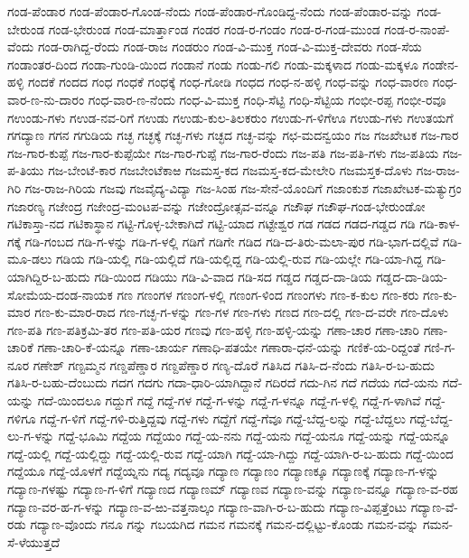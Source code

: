 ಗಂಡ-ಪೆಂಡಾರ
ಗಂಡ-ಪೆಂಡಾರ-ಗೊಂಡ-ನೆಂದು
ಗಂಡ-ಪೆಂಡಾರ-ಗೊಂಡಿದ್ದ-ನೆಂದು
ಗಂಡ-ಪೆಂಡಾರ-ವನ್ನು
ಗಂಡ-ಬೇರುಂಡ
ಗಂಡ-ಭೇರುಂಡ
ಗಂಡ-ಮಾರ್ತ್ತಾಂಡ
ಗಂಡರ
ಗಂಡ-ರ-ಗಂಡಂ
ಗಂಡ-ರ-ಗಂಡ-ಮುಂಡ
ಗಂಡ-ರ-ನಾಂಪೆ-ವೆಂದು
ಗಂಡ-ರಾಗಿದ್ದ-ರೆಂದು
ಗಂಡ-ರಾಜ
ಗಂಡರುಂ
ಗಂಡ-ವಿ-ಮುಕ್ತ
ಗಂಡ-ವಿ-ಮುಕ್ತ-ದೇವರು
ಗಂಡ-ಸೆಯ
ಗಂಡಾಂತರ-ದಿಂದ
ಗಂಡಾ-ಗುಂಡಿ-ಯಿಂದ
ಗಂಡಾನೆ
ಗಂಡು
ಗಂಡು-ಗಲಿ
ಗಂಡು-ಮಕ್ಕಳಾದ
ಗಂಡು-ಮಕ್ಕಳೂ
ಗಂಡೇನ-ಹಳ್ಳಿ
ಗಂದಕೆ
ಗಂದದ
ಗಂಧ
ಗಂಧಕೆ
ಗಂಧಕ್ಕೆ
ಗಂಧ-ಗೋಡಿ
ಗಂಧದ
ಗಂಧ-ನ-ಹಳ್ಳಿ
ಗಂಧ-ವನ್ನು
ಗಂಧ-ವಾರಣ
ಗಂಧ-ವಾರ-ಣ-ನು-ದಾರಂ
ಗಂಧ-ವಾರ-ಣ-ನೆಂದು
ಗಂಧ-ವಿ-ಮುಕ್ತ
ಗಂಧಿ-ಸೆಟ್ಟಿ
ಗಂಧಿ-ಸೆಟ್ಟಿಯ
ಗಂಭೀ-ರಪ್ಪ
ಗಂಭೀ-ರವೂ
ಗಉಂಡು-ಗಳು
ಗಉಡ-ನವ-ರಿಗೆ
ಗಉಡು
ಗಉಡು-ಕುಲ-ತಿಲಕರುಂ
ಗಉಡು-ಗ-ಳಿಗೆಊ
ಗಉಡು-ಗಳು
ಗಉತಯಗೆ
ಗಗದ್ಯಾಣ
ಗಗನ
ಗಗುಡಿಯ
ಗಚ್ಛ
ಗಚ್ಛಕ್ಕೆ
ಗಚ್ಛ-ಗಳು
ಗಚ್ಛದ
ಗಚ್ಛ-ವನ್ನು
ಗಛ-ಮದನ್ವಯಂ
ಗಜ
ಗಜಖೇಟಕ
ಗಜ-ಗಾರ
ಗಜ-ಗಾರ-ಕುಪ್ಪೆ
ಗಜ-ಗಾರ-ಕುಪ್ಪೆಯೇ
ಗಜ-ಗಾರ-ಗುಪ್ಪೆ
ಗಜ-ಗಾರ-ರೆಂದು
ಗಜ-ಪತಿ
ಗಜ-ಪತಿ-ಗಳು
ಗಜ-ಪತಿಯ
ಗಜ-ಪ-ತಿಯು
ಗಜ-ಬೇಂಟೆ-ಕಾರ
ಗಜಬೇಂಟೆಕಾಱ
ಗಜಮಸ್ತ-ಕದ
ಗಜಮಸ್ತ-ಕದ-ಮೇಲೇರಿ
ಗಜಮಸ್ತಕ-ದೊಳು
ಗಜ-ರಾಜ-ಗಿರಿ
ಗಜ-ರಾಜ-ಗಿರಿಯ
ಗಜವು
ಗಜವೈದ್ಯ-ವಿದ್ಯಾ
ಗಜ-ಸಿಂಹ
ಗಜ-ಸೇನೆ-ಯೊಂದಿಗೆ
ಗಜಾಂಕುಶ
ಗಜಾಖೇಟಕ-ಮತ್ಯುಗ್ರಂ
ಗಜಾರಣ್ಯ
ಗಜೇಂದ್ರ
ಗಜೇಂದ್ರ-ಮಂಟಪ-ವನ್ನು
ಗಜೇಂದ್ರೋತ್ಸವ-ವನ್ನೂ
ಗಜೌಘ
ಗಜೌಘ-ಗಂಡ-ಭೇರುಂಡೋ
ಗಟಿಕಾಸ್ತಾ-ನದ
ಗಟಿಕಾಸ್ಥಾನ
ಗಟ್ಟಿ-ಗೊಳ್ಳ-ಬೇಕಾಗಿದೆ
ಗಟ್ಟಿ-ಯಾದ
ಗಟ್ಟೇಶ್ವರ
ಗಡ
ಗಡದ
ಗಡದ-ಗಡ್ಡದ
ಗಡಿ
ಗಡಿ-ಕಾಳ-ಗಕ್ಕೆ
ಗಡಿ-ಗಂಬದ
ಗಡಿ-ಗ-ಳನ್ನು
ಗಡಿ-ಗ-ಳಲ್ಲಿ
ಗಡಿಗೆ
ಗಡಿಗೇ
ಗಡಿದ
ಗಡಿ-ದ-ತಿರು-ಮಲಾ-ಪುರ
ಗಡಿ-ಭಾಗ-ದಲ್ಲಿವೆ
ಗಡಿ-ಮೂ-ಡಲು
ಗಡಿಯ
ಗಡಿ-ಯಲ್ಲಿ
ಗಡಿ-ಯಲ್ಲಿದೆ
ಗಡಿ-ಯಲ್ಲಿದ್ದ
ಗಡಿ-ಯಲ್ಲಿ-ರುವ
ಗಡಿ-ಯಲ್ಲೇ
ಗಡಿ-ಯಾ-ಗಿದ್ದ
ಗಡಿ-ಯಾಗಿದ್ದಿರ-ಬ-ಹುದು
ಗಡಿ-ಯಿಂದ
ಗಡಿಯು
ಗಡಿ-ವಿ-ವಾದ
ಗಡಿ-ಸದ
ಗಡ್ಡದ
ಗಡ್ಡದ-ದಾ-ಡಿಯ
ಗಡ್ಡದ-ದಾ-ಡಿಯ-ಸೋಮೆಯ-ದಂಡ-ನಾಯಕ
ಗಣ
ಗಣಂಗಳ
ಗಣಂಗ-ಳಲ್ಲಿ
ಗಣಂಗ-ಳಿಂದ
ಗಣಂಗಳು
ಗಣ-ಕ-ಕುಲ
ಗಣ-ಕರು
ಗಣ-ಕು-ಮಾರ
ಗಣ-ಕು-ಮಾರ-ರಾದ
ಗಣ-ಗಚ್ಛ-ಗ-ಳನ್ನು
ಗಣ-ಗಳ
ಗಣ-ಗಳು
ಗಣದ
ಗಣ-ದಲ್ಲಿ
ಗಣ-ದ-ವರೇ
ಗಣ-ದೊಳು
ಗಣ-ಪತಿ
ಗಣ-ಪತಿಕ್ರಮಿ-ತರ
ಗಣ-ಪತಿ-ಯರ
ಗಣವು
ಗಣ-ಹಳ್ಳಿ
ಗಣ-ಹಳ್ಳಿ-ಯನ್ನು
ಗಣಾ-ಚಾರ
ಗಣಾ-ಚಾರಿ
ಗಣಾ-ಚಾರಿಕೆ
ಗಣಾ-ಚಾರಿ-ಕೆ-ಯನ್ನೂ
ಗಣಾ-ಚಾರ್ಯ
ಗಣಾಧಿ-ಪತಯೇ
ಗಣಾರಾ-ಧನೆ-ಯನ್ನು
ಗಣಿಕೆ-ಯ-ರಿದ್ದಂತೆ
ಗಣಿ-ಗ-ನೂರ
ಗಣೇಶ್
ಗಣ್ಟಮ್ಮನ
ಗಣ್ಡಪೆಣ್ಡಾರ
ಗಣ್ದಪೆಣ್ಡಾರ
ಗಣ್ಯ-ದೊರೆ
ಗತಿಸಿದ
ಗತಿಸಿ-ದ-ನೆಂದು
ಗತಿಸಿ-ರ-ಬ-ಹುದು
ಗತಿಸಿ-ರ-ಬಹು-ದೆಂಬುದು
ಗದಗ
ಗದಗು
ಗದಾ-ಧಾರಿ-ಯಾಗಿದ್ದಾನೆ
ಗದಿರದೆ
ಗದು-ಗಿನ
ಗದೆ
ಗದೆಯ
ಗದೆ-ಯನು
ಗದೆ-ಯನ್ನು
ಗದೆ-ಯಿಂದಲೂ
ಗದ್ದುಗೆ
ಗದ್ದೆ
ಗದ್ದೆ-ಗಳ
ಗದ್ದೆ-ಗ-ಳನ್ನು
ಗದ್ದೆ-ಗ-ಳನ್ನೂ
ಗದ್ದೆ-ಗ-ಳಲ್ಲಿ
ಗದ್ದೆ-ಗ-ಳಾಗಿವೆ
ಗದ್ದೆ-ಗಳಿಗೂ
ಗದ್ದೆ-ಗ-ಳಿಗೆ
ಗದ್ದೆ-ಗಳಿ-ರುತ್ತಿದ್ದವು
ಗದ್ದೆ-ಗಳು
ಗದ್ದೆಗೆ
ಗದ್ದೆ-ಗೆವೂ
ಗದ್ದೆ-ಬೆದ್ದ-ಲನ್ನು
ಗದ್ದೆ-ಬೆದ್ದಲು
ಗದ್ದೆ-ಬೆದ್ದ-ಲು-ಗ-ಳನ್ನು
ಗದ್ದೆ-ಭೂಮಿ
ಗದ್ದೆಯ
ಗದ್ದೆಯಂ
ಗದ್ದೆ-ಯ-ನನು
ಗದ್ದೆ-ಯನು
ಗದ್ದೆ-ಯನೂ
ಗದ್ದೆ-ಯನ್ನು
ಗದ್ದೆ-ಯನ್ನೂ
ಗದ್ದೆ-ಯಲ್ಲಿ
ಗದ್ದೆ-ಯಲ್ಲಿದ್ದು
ಗದ್ದೆ-ಯಲ್ಲಿ-ರುವ
ಗದ್ದೆ-ಯಾಗಿ
ಗದ್ದೆ-ಯಾ-ಗಿದ್ದು
ಗದ್ದೆ-ಯಾಗಿ-ರ-ಬ-ಹುದು
ಗದ್ದೆ-ಯಿಂದ
ಗದ್ದೆಯೂ
ಗದ್ದೆ-ಯೊಳಗೆ
ಗದ್ದೆಯ್ನನು
ಗದ್ಯ
ಗದ್ಯವೂ
ಗದ್ಯಾಣ
ಗದ್ಯಾಣಂ
ಗದ್ಯಾಣಕ್ಕೂ
ಗದ್ಯಾಣಕ್ಕೆ
ಗದ್ಯಾಣ-ಗ-ಳನ್ನು
ಗದ್ಯಾಣ-ಗಳಷ್ಟು
ಗದ್ಯಾಣ-ಗ-ಳಿಗೆ
ಗದ್ಯಾಣದ
ಗದ್ಯಾಣಮ್
ಗದ್ಯಾಣವ
ಗದ್ಯಾಣ-ವನ್ನು
ಗದ್ಯಾಣ-ವನ್ನೂ
ಗದ್ಯಾಣ-ವ-ರಹ
ಗದ್ಯಾಣ-ವರ-ಹ-ಗ-ಳನ್ನು
ಗದ್ಯಾಣ-ವ-ಱು-ವತ್ತನಾಲ್ಕಂ
ಗದ್ಯಾಣ-ವಾಗಿ-ರ-ಬ-ಹುದು
ಗದ್ಯಾಣ-ವಿಪ್ಪತ್ತೆಂಟು
ಗದ್ಯಾಣ-ವೆ-ರಡು
ಗದ್ಯಾಣ-ವೊಂದು
ಗನೂ
ಗನ್ನು
ಗಬಯಗಿದ
ಗಮನ
ಗಮನಕ್ಕೆ
ಗಮನ-ದಲ್ಲಿಟ್ಟು-ಕೊಂಡು
ಗಮನ-ವನ್ನು
ಗಮನ-ಸೆ-ಳೆಯುತ್ತದೆ
